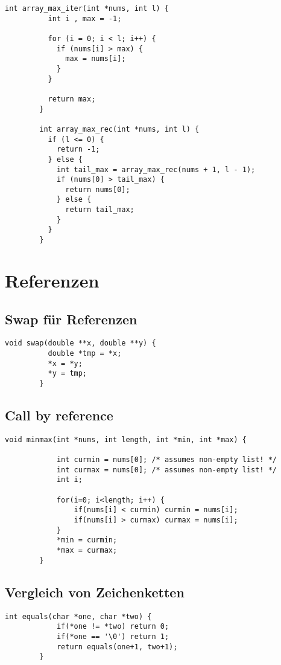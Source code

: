 \documentclass[]{article}
\begin{document}
	\begin{lstlisting}[gobble=4]
		int array_max_iter(int *nums, int l) {
		  int i , max = -1;
		  
		  for (i = 0; i < l; i++) {
		    if (nums[i] > max) {
		      max = nums[i];
		    }
		  }
		  
		  return max;
		}
		
		int array_max_rec(int *nums, int l) {
		  if (l <= 0) {
		    return -1;
		  } else {
		    int tail_max = array_max_rec(nums + 1, l - 1);
		    if (nums[0] > tail_max) {
		      return nums[0];
		    } else {
		      return tail_max;
		    }
		  }
		}		
	\end{lstlisting}
	
	\clearpage

	\section{Referenzen}
	
	\subsection{Swap für Referenzen}
	
	\begin{lstlisting}[gobble=4]
		void swap(double **x, double **y) {
		  double *tmp = *x;
		  *x = *y;
		  *y = tmp;
		}
	\end{lstlisting}
	
	\subsection{Call by reference}
	
	\begin{lstlisting}[gobble=4]
		void minmax(int *nums, int length, int *min, int *max) {
		
			int curmin = nums[0]; /* assumes non-empty list! */
			int curmax = nums[0]; /* assumes non-empty list! */
			int i;
			
			for(i=0; i<length; i++) {
				if(nums[i] < curmin) curmin = nums[i];
				if(nums[i] > curmax) curmax = nums[i];
			}
			*min = curmin;
			*max = curmax;
		}		
	\end{lstlisting}	
	
	\subsection{Vergleich von Zeichenketten}
	
	\begin{lstlisting}[gobble=4]
		int equals(char *one, char *two) {    
			if(*one != *two) return 0;
			if(*one == '\0') return 1;
			return equals(one+1, two+1);
		}
	\end{lstlisting}
\end{document}
